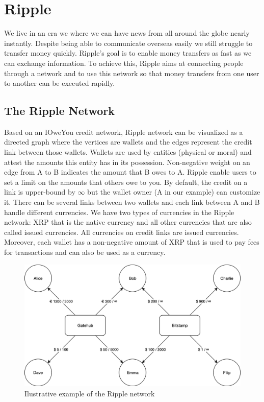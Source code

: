 \section{Ripple}
We live in an era we where we can have news from all around the globe nearly instantly. Despite being able to communicate overseas easily we still struggle to transfer money quickly. Ripple's goal is to enable money transfers as fast as we can exchange information. To achieve this, Ripple aims at connecting people through a network and to use this network so that money transfers from one user to another can be executed rapidly. 
\subsection{The Ripple Network}
Based on an IOweYou credit network, Ripple network can be visualized as a directed graph where the vertices are wallets and the edges represent the credit link between those wallets. Wallets are used by entities (physical or moral) and attest the amounts this entity has in its possession. Non-negative weight on an edge from A to B indicates the amount that B owes to A. Ripple enable users to set a limit on the amounts that others owe to you. By default, the credit on a link is upper-bound by $\infty$ but the wallet owner (A in our example) can customize it. There can be several links between two wallets and each link between A and B handle different currencies. We have two types of currencies in the Ripple network: XRP that is the native currency and all other currencies that are also called issued currencies. All currencies on credit links are issued currencies. Moreover, each wallet has a non-negative amount of XRP that is used to pay fees for transactions and can also be used as a currency.

\begin{figure}[h!]
\includegraphics[width=\linewidth]{network.png}
\caption{Ilustrative example of the Ripple network}
\label{fig:network}
\end{figure}

